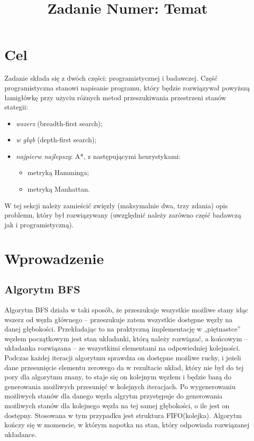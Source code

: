 \documentclass{classrep}
\author{
  \studentinfo{Piotr Polakowski}{247768} \and
  \studentinfo{Jakub Samek}{247781} \and
  \studentinfo{Filip Kobierski}{242336}
}
\title{Zadanie Numer: Temat}
\begin{document}
\maketitle

\section{Cel}
Zadanie składa się z dwóch części: programistycznej i badawczej.
Część programistyczna stanowi napisanie programu, który będzie rozwiązywał powyższą łamigłówkę przy użyciu różnych metod przeszukiwania przestrzeni stanów stategii:
\begin{itemize}
\item \emph{wszerz} (breadth-first search);
\item \emph{w głąb} (depth-first search);
\item \emph{najpierw najlepszy}: A*, z następującymi heurystykami:
  \begin{itemize}
  \item metryką Hamminga;
  \item metryką Manhattan.
  \end{itemize}
\end{itemize}



{\color{blue}
W tej sekcji należy zamieścić zwięzły (maksymalnie dwa, trzy zdania) opis
problemu, który był rozwiązywany (uwzględnić należy zarówno część badawczą jak
i programistyczną).}

\section{Wprowadzenie}
\subsection{Algorytm BFS}
Algorytm BFS działa w taki sposób, że przeszukuje wszystkie możliwe stany idąc wszerz od węzła głównego – przeszukuje zatem wszystkie dostępne węzły na danej głębokości. Przekładając to na praktyczną implementację w „piętnastce” węzłem początkowym jest stan układanki, którą należy rozwiązać, a końcowym – układanka rozwiązana – ze wszystkimi elementami na odpowiedniej kolejności. Podczas każdej iteracji algorytmu sprawdza on dostępne możliwe ruchy, i jeżeli dane przesunięcie elementu zerowego da w rezultacie układ, który nie był do tej pory dla algorytmu znany, to staje się on kolejnym węzłem i będzie bazą do generowania możliwych przesunięć w kolejnych iteracjach. Po wygenerowaniu możliwych stanów dla danego węzła algrytm przystępuje do generowania możliwych stanów dla kolejnego węzła na tej samej głębokości, o ile jest on dostępny. Stosowana w tym przypadku jest struktura FIFO(kolejka). Algorytm kończy się w momencie, w którym napotka na stan, który odpowiada rozwiązanej układance.
\end{document}
